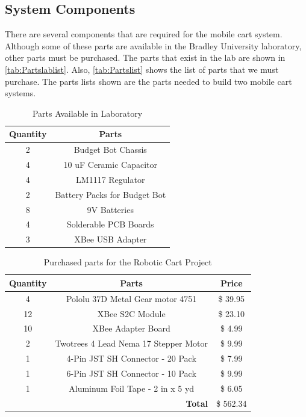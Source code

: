 \documentclass[letterpaper,12pt]{article}   %
\begin{document}
\subsection{System Components}
There are several components that are required for the mobile cart system. Although some of these parts are available in the Bradley University laboratory, other parts must be purchased. The parts that exist in the lab are shown in \autoref{tab:Partslablist}. Also, \autoref{tab:Partslist} shows the list of parts that we must purchase. The parts lists shown are the parts needed to build two mobile cart systems.

\begin{table}[h!]
  \centering
  \begin{tabular}{c|c}
      \toprule
      \textbf{Quantity} & \textbf{Parts}\\
      \toprule
      2 & Budget Bot Chassis\\
      4 & 10 uF Ceramic Capacitor\\
      4 & LM1117 Regulator\\
      2 & Battery Packs for Budget Bot\\
      8 & 9V Batteries\\
      4 & Solderable PCB Boards\\
      3 & XBee USB Adapter\\
      \bottomrule
  \end{tabular}
  \caption{Parts Available in Laboratory}
  \label{tab:Partslablist}
\end{table}

\begin{table}[h!]
  \centering
  \begin{tabular}{c|c|c}
    \toprule
    \textbf{Quantity} & \textbf{Parts} & \textbf{Price}\\
    \toprule
    4 & Pololu 37D Metal Gear motor 4751 & \$ 39.95\\
    12 & XBee S2C Module & \$ 23.10\\
    10 & XBee Adapter Board & \$ 4.99\\
    2 & Twotrees 4 Lead Nema 17 Stepper Motor & \$ 9.99\\
    1 & 4-Pin JST SH Connector - 20 Pack & \$ 7.99\\
    1 & 6-Pin JST SH Connector - 10 Pack & \$ 9.99\\
    1 & Aluminum Foil Tape - 2 in x 5 yd & \$ 6.05\\
    \bottomrule
    \multicolumn{2}{r|}{\textbf{Total}} & \$ 562.34\\
    \bottomrule
  \end{tabular}
  \caption{Purchased parts for the Robotic Cart Project}
  \label{tab:Partslist}
\end{table}
\end{document}
